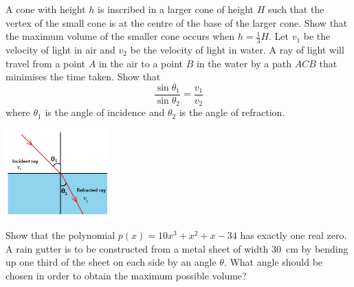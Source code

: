 \begin{questions}
  \questioE A cone with height $ h $ is inscribed in a larger cone of height $ H $ such that the vertex of the small cone
            is at the centre of the base of the larger cone. Show that the maximum volume of the smaller cone occurs when $ h = \frac{1}{3} H $.
  \questioE Let $ v_1 $ be the velocity of light in air and $ v_2 $ be the velocity of light in water. A ray of light will travel from a point $ A $
            in the air to a point $ B $ in the water by a path $ ACB $ that minimises the time taken. Show that
            \begin{displaymath}
              \frac{\sin \theta_1}{\sin \theta_2} = \frac{v_1}{v_2}
            \end{displaymath}
            where $ \theta_1 $ is the angle of incidence and $ \theta_2 $ is the angle of refraction.
            \begin{center}
              \includegraphics[width=0.3\textwidth]{snell}
            \end{center}
  \questioE Show that the polynomial $ p(x) = 10x^3 + x^2 + x - 34 $ has exactly one real zero.
  \questioE A rain gutter is to be constructed from a metal sheet of width \SI{30}{\centi\metre} by bending up
            one third of the sheet on each side by an angle $ \theta $. What angle should be chosen in order to
            obtain the maximum possible volume?

\end{questions}
